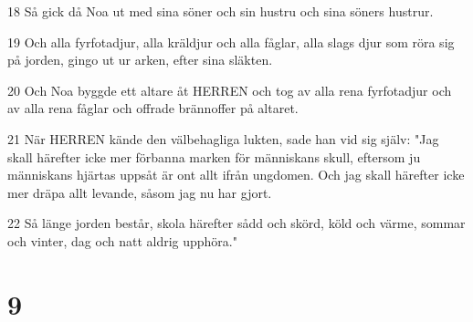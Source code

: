 \par 18 Så gick då Noa ut med sina söner och sin hustru och sina söners hustrur.
\par 19 Och alla fyrfotadjur, alla kräldjur och alla fåglar, alla slags djur som röra sig på jorden, gingo ut ur arken, efter sina släkten.
\par 20 Och Noa byggde ett altare åt HERREN och tog av alla rena fyrfotadjur och av alla rena fåglar och offrade brännoffer på altaret.
\par 21 När HERREN kände den välbehagliga lukten, sade han vid sig själv: "Jag skall härefter icke mer förbanna marken för människans skull, eftersom ju människans hjärtas uppsåt är ont allt ifrån ungdomen. Och jag skall härefter icke mer dräpa allt levande, såsom jag nu har gjort.
\par 22 Så länge jorden består, skola härefter sådd och skörd, köld och värme, sommar och vinter, dag och natt aldrig upphöra."

\chapter{9}

